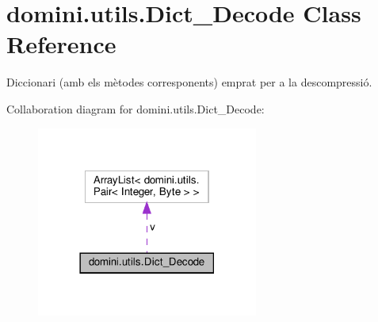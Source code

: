 \hypertarget{classdomini_1_1utils_1_1Dict__Decode}{}\section{domini.\+utils.\+Dict\+\_\+\+Decode Class Reference}
\label{classdomini_1_1utils_1_1Dict__Decode}


Diccionari (amb els mètodes corresponents) emprat per a la descompressió.  




Collaboration diagram for domini.\+utils.\+Dict\+\_\+\+Decode\+:\nopagebreak
\begin{figure}[H]
\begin{center}
\leavevmode
\includegraphics[width=206pt]{classdomini_1_1utils_1_1Dict__Decode__coll__graph}
\end{center}
\end{figure}
